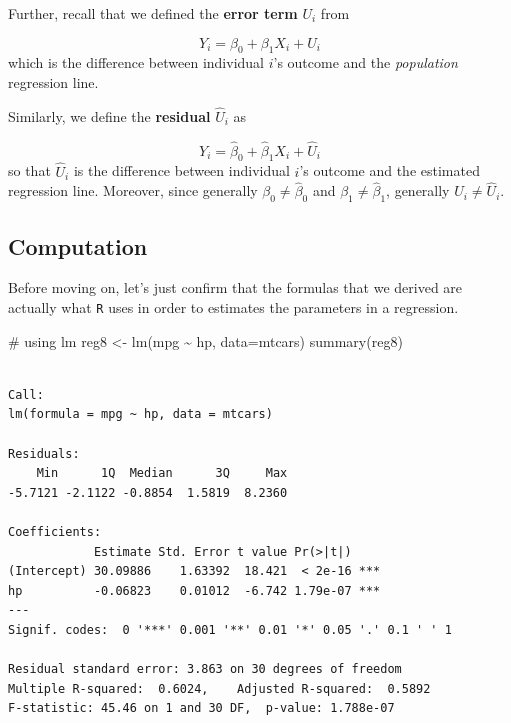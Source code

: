 \documentclass[
  letterpaper,
  DIV=11,
  numbers=noendperiod]{scrreprt}
\newenvironment{Shaded}{\begin{snugshade}}{\end{snugshade}}
\newcommand{\AttributeTok}[1]{\textcolor[rgb]{0.40,0.45,0.13}{#1}}
\newcommand{\CommentTok}[1]{\textcolor[rgb]{0.37,0.37,0.37}{#1}}
\newcommand{\FunctionTok}[1]{\textcolor[rgb]{0.28,0.35,0.67}{#1}}
\newcommand{\NormalTok}[1]{\textcolor[rgb]{0.00,0.23,0.31}{#1}}
\newcommand{\OtherTok}[1]{\textcolor[rgb]{0.00,0.23,0.31}{#1}}
\newcommand{\SpecialCharTok}[1]{\textcolor[rgb]{0.37,0.37,0.37}{#1}}
\begin{document}
Further, recall that we defined the \textbf{error term} \(U_i\) from

\[
  Y_i = \beta_0 + \beta_1 X_i + U_i
\] which is the difference between individual \(i\)'s outcome and the
\emph{population} regression line.

Similarly, we define the \textbf{residual} \(\hat{U}_i\) as

\[
  Y_i = \hat{\beta}_0 + \hat{\beta}_1 X_i + \hat{U}_i
\] so that \(\hat{U}_i\) is the difference between individual \(i\)'s
outcome and the estimated regression line. Moreover, since generally
\(\beta_0 \neq \hat{\beta}_0\) and \(\beta_1 \neq \hat{\beta}_1\),
generally \(U_i \neq \hat{U}_i\).

\subsection{Computation}\label{computation-6}

Before moving on, let's just confirm that the formulas that we derived
are actually what \texttt{R} uses in order to estimates the parameters
in a regression.

\begin{Shaded}
\begin{Highlighting}[]
\CommentTok{\# using lm}
\NormalTok{reg8 }\OtherTok{\textless{}{-}} \FunctionTok{lm}\NormalTok{(mpg }\SpecialCharTok{\textasciitilde{}}\NormalTok{ hp, }\AttributeTok{data=}\NormalTok{mtcars)}
\FunctionTok{summary}\NormalTok{(reg8)}
\end{Highlighting}
\end{Shaded}

\begin{verbatim}

Call:
lm(formula = mpg ~ hp, data = mtcars)

Residuals:
    Min      1Q  Median      3Q     Max 
-5.7121 -2.1122 -0.8854  1.5819  8.2360 

Coefficients:
            Estimate Std. Error t value Pr(>|t|)    
(Intercept) 30.09886    1.63392  18.421  < 2e-16 ***
hp          -0.06823    0.01012  -6.742 1.79e-07 ***
---
Signif. codes:  0 '***' 0.001 '**' 0.01 '*' 0.05 '.' 0.1 ' ' 1

Residual standard error: 3.863 on 30 degrees of freedom
Multiple R-squared:  0.6024,    Adjusted R-squared:  0.5892 
F-statistic: 45.46 on 1 and 30 DF,  p-value: 1.788e-07
\end{verbatim}
\end{document}
